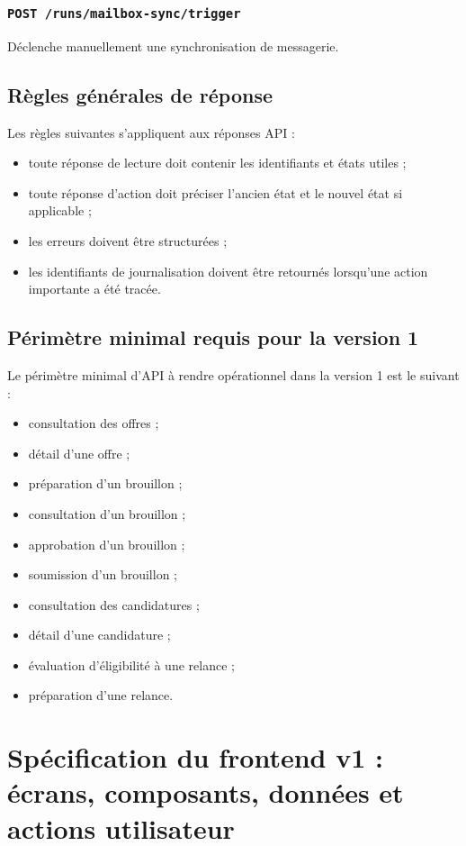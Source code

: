 \documentclass[11pt,a4paper]{article}
\begin{document}
\subsubsection{\texttt{POST /runs/mailbox-sync/trigger}}
Déclenche manuellement une synchronisation de messagerie.

\subsection{Règles générales de réponse}

Les règles suivantes s’appliquent aux réponses API :

\begin{itemize}
    \item toute réponse de lecture doit contenir les identifiants et états utiles ;
    \item toute réponse d’action doit préciser l’ancien état et le nouvel état si applicable ;
    \item les erreurs doivent être structurées ;
    \item les identifiants de journalisation doivent être retournés lorsqu’une action importante a été tracée.
\end{itemize}

\subsection{Périmètre minimal requis pour la version 1}

Le périmètre minimal d’API à rendre opérationnel dans la version 1 est le suivant :

\begin{itemize}
    \item consultation des offres ;
    \item détail d’une offre ;
    \item préparation d’un brouillon ;
    \item consultation d’un brouillon ;
    \item approbation d’un brouillon ;
    \item soumission d’un brouillon ;
    \item consultation des candidatures ;
    \item détail d’une candidature ;
    \item évaluation d’éligibilité à une relance ;
    \item préparation d’une relance.
\end{itemize}
\section{Spécification du frontend v1 : écrans, composants, données et actions utilisateur}
\end{document}
